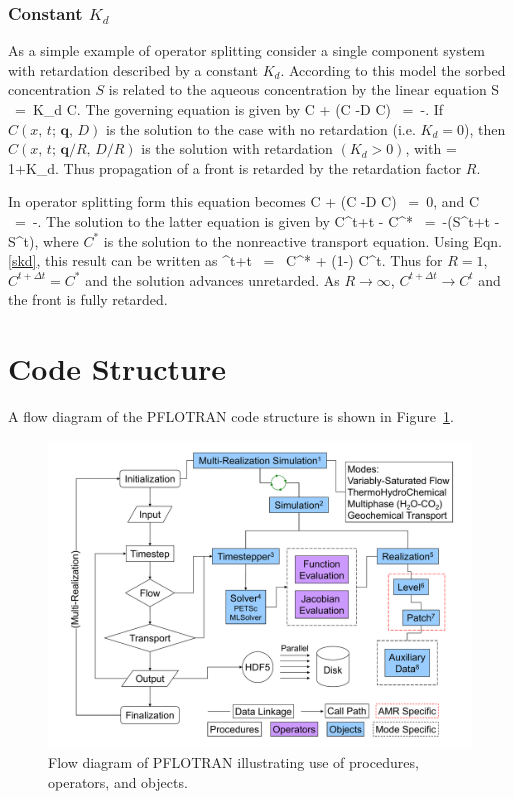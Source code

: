 \documentclass[12pt]{article}
\def\EQ#1\EN{\begin{equation}#1\end{equation}}
\newcommand{\eq}{\ =\ }
\newcommand{\p}{{\partial}}
\newcommand{\bnabla}{\boldsymbol{\nabla}}
\newcommand{\bq}{\boldsymbol{q}}
\begin{document}
\subsubsection{Constant $K_d$}

As a simple example of operator splitting consider a single component system with retardation described by a constant $K_d$. According to this model the sorbed concentration $S$ is related to the aqueous concentration by the linear equation
\EQ\label{skd}
S \eq K_d C.
\EN
The governing equation is given by
\EQ
\frac{\p}{\p t} \varphi C + \bnabla\cdot\big(\bq C -\varphi D \bnabla C\big) \eq -\frac{\p S}{\p t}.
\EN
If $C(x,\,t;\, \bq,\,D)$ is the solution to the case with no retardation (i.e. $K_d=0$), then $C(x,\,t;\, \bq/R,\,D/R)$ is the solution with retardation $(K_d>0)$,
with
\EQ
R = 1+K_d.
\EN
Thus propagation of a front is retarded by the retardation factor $R$.

In operator splitting form this equation becomes
\EQ
\frac{\p}{\p t} \varphi C + \bnabla\cdot\big(\bq C -\varphi D \bnabla C\big) \eq 0,
\EN
and
\EQ
\frac{d}{d t} \varphi C \eq -.
\EN
The solution to the latter equation is given by
\EQ
\varphi C^{t+\Delta t} - \varphi C^* \eq -\big(S^{t+\Delta t} - S^t\big),
\EN
where $C^*$ is the solution to the nonreactive transport equation. Using Eqn.\eqref{skd}, this result can be written as
\EQ
C^{t+\Delta t} \eq {} C^* + \left(1-\right) C^t.
\EN
Thus for $R=1$, $C^{t+\Delta t}=C^*$ and the solution advances unretarded. As $R\rightarrow\infty$, $C^{t+\Delta t} \rightarrow C^t$ and the front is fully retarded.

\newpage

\section{Code Structure}

\setcounter{equation}{0}

A flow diagram of the PFLOTRAN code structure is shown in Figure~\ref{fdiag}.

\begin{figure}[h]\centering
\includegraphics[scale=0.3]{./figs/multi-realization_flowchart}
\caption{Flow diagram of PFLOTRAN illustrating use of procedures, operators, and objects.}\label{fdiag}
\end{figure}
\end{document}
